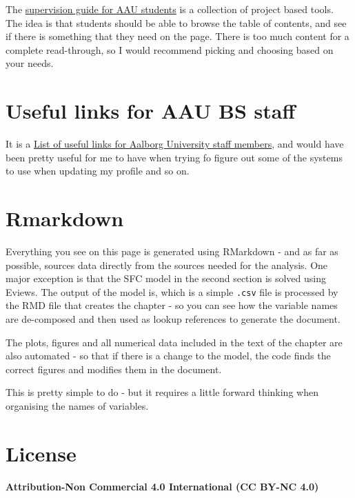 \documentclass[
]{book}
\begin{document}
The \href{https://robabsmith.github.io/supervision_gitpage/}{supervision guide for AAU students} is a collection of project based tools. The idea is that students should be able to browse the table of contents, and see if there is something that they need on the page. There is too much content for a complete read-through, so I would recommend picking and choosing based on your needs.

\hypertarget{useful-links-for-aau-bs-staff}{%
\section{Useful links for AAU BS staff}\label{useful-links-for-aau-bs-staff}}

It is a \href{https://robabsmith.github.io/aau_info_page/}{List of useful links for Aalborg University staff members}, and would have been pretty useful for me to have when trying fo figure out some of the systems to use when updating my profile and so on.

\hypertarget{rmarkdown}{%
\section{Rmarkdown}\label{rmarkdown}}

Everything you see on this page is generated using RMarkdown - and as far as possible, sources data directly from the sources needed for the analysis. One major exception is that the SFC model in the second section is solved using Eviews. The output of the model is, which is a simple \texttt{.csv} file is processed by the RMD file that creates the chapter - so you can see how the variable names are de-composed and then used as lookup references to generate the document.

The plots, figures and all numerical data included in the text of the chapter are also automated - so that if there is a change to the model, the code finds the correct figures and modifies them in the document.

This is pretty simple to do - but it requires a little forward thinking when organising the names of variables.

\hypertarget{license}{%
\section{License}\label{license}}

\textbf{Attribution-Non Commercial 4.0 International (CC BY-NC 4.0)}
\end{document}
